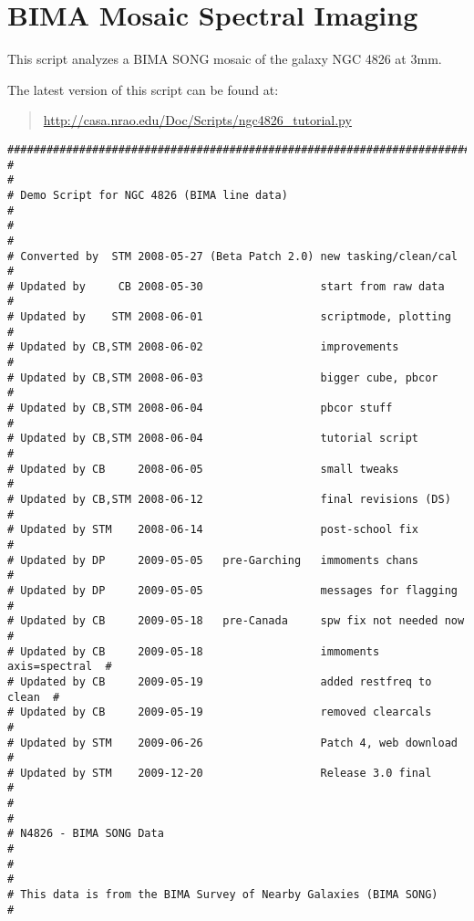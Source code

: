 \section{BIMA Mosaic Spectral Imaging}
\label{section:scripts.ngc4826}

This script analyzes a BIMA SONG mosaic of the galaxy NGC 4826
at 3mm.

The latest version of this script can be found at:
\begin{quote}
   \url{http://casa.nrao.edu/Doc/Scripts/ngc4826_tutorial.py}
\end{quote}

\small
\begin{verbatim}
##########################################################################
#                                                                        #
# Demo Script for NGC 4826 (BIMA line data)                              #
#                                                                        #
# Converted by  STM 2008-05-27 (Beta Patch 2.0) new tasking/clean/cal    #
# Updated by     CB 2008-05-30                  start from raw data      #
# Updated by    STM 2008-06-01                  scriptmode, plotting     #
# Updated by CB,STM 2008-06-02                  improvements             #
# Updated by CB,STM 2008-06-03                  bigger cube, pbcor       #
# Updated by CB,STM 2008-06-04                  pbcor stuff              #
# Updated by CB,STM 2008-06-04                  tutorial script          #
# Updated by CB     2008-06-05                  small tweaks             #
# Updated by CB,STM 2008-06-12                  final revisions (DS)     #
# Updated by STM    2008-06-14                  post-school fix          #
# Updated by DP     2009-05-05   pre-Garching   immoments chans          #
# Updated by DP     2009-05-05                  messages for flagging    #
# Updated by CB     2009-05-18   pre-Canada     spw fix not needed now   #
# Updated by CB     2009-05-18                  immoments axis=spectral  #
# Updated by CB     2009-05-19                  added restfreq to clean  #
# Updated by CB     2009-05-19                  removed clearcals        #
# Updated by STM    2009-06-26                  Patch 4, web download    #
# Updated by STM    2009-12-20                  Release 3.0 final        #
#                                                                        #
# N4826 - BIMA SONG Data                                                 #
#                                                                        #
# This data is from the BIMA Survey of Nearby Galaxies (BIMA SONG)       #

\end{verbatim}
